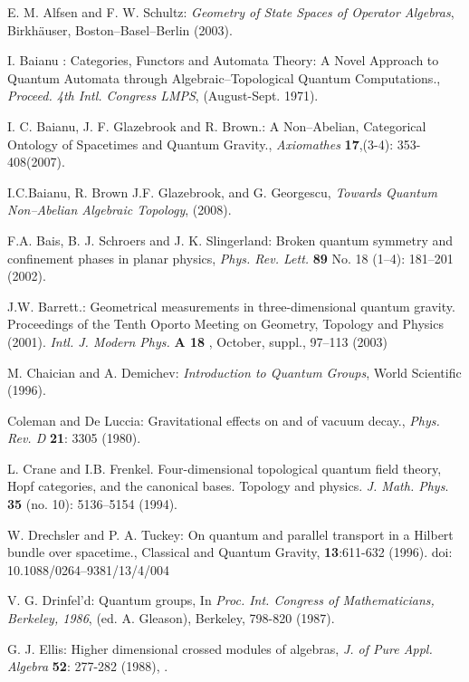 \documentclass[12pt]{article}
\theoremstyle{plain}
\theoremstyle{definition}
\numberwithin{equation}{section}
\newcommand{\<}{{\langle}}
\begin{document}
\begin{thebibliography}{9}

E. M. Alfsen and F. W. Schultz: \emph{Geometry of State Spaces of Operator Algebras}, Birkh\"auser, Boston--Basel--Berlin (2003).

I. Baianu : Categories, Functors and Automata Theory: A Novel Approach to Quantum Automata through Algebraic--Topological Quantum Computations., \textit{Proceed. 4th Intl. Congress LMPS}, (August-Sept. 1971).

I. C. Baianu, J. F. Glazebrook and R. Brown.: A Non--Abelian, Categorical Ontology of Spacetimes and Quantum Gravity., \emph{Axiomathes} \textbf{17},(3-4): 353-408(2007).

I.C.Baianu, R. Brown J.F. Glazebrook, and G. Georgescu, {\em Towards Quantum Non--Abelian Algebraic Topology}, (2008).

F.A. Bais, B. J. Schroers and J. K. Slingerland: Broken quantum symmetry and confinement phases in planar physics, \emph{Phys. Rev. Lett.} \textbf{89} No. 18 (1--4): 181--201 (2002).

J.W. Barrett.: Geometrical measurements in three-dimensional quantum gravity.
Proceedings of the Tenth Oporto Meeting on Geometry, Topology and Physics (2001).
\textit{Intl. J. Modern Phys.} \textbf{A 18} , October, suppl., 97--113 (2003)

M. Chaician and A. Demichev: \emph{Introduction to Quantum Groups}, World Scientific (1996).

Coleman and De Luccia: Gravitational effects on and of vacuum decay., \emph{Phys. Rev. D} \textbf{21}: 3305 (1980).

L. Crane and I.B. Frenkel. Four-dimensional topological quantum field theory, Hopf categories, and the canonical bases. Topology and physics. \textit{J. Math. Phys}. \textbf{35} (no. 10): 5136--5154 (1994).

W. Drechsler and P. A. Tuckey:  On quantum and parallel transport in a Hilbert bundle over spacetime., Classical and Quantum Gravity, \textbf{13}:611-632 (1996).
doi: 10.1088/0264--9381/13/4/004

V. G. Drinfel'd: Quantum groups, In \emph{Proc. Int. Congress of
Mathematicians, Berkeley, 1986}, (ed. A. Gleason), Berkeley, 798-820 (1987).

G. J. Ellis: Higher dimensional crossed modules of algebras,
\emph{J. of Pure Appl. Algebra} \textbf{52}: 277-282 (1988), .


\end{thebibliography}
\end{document}
